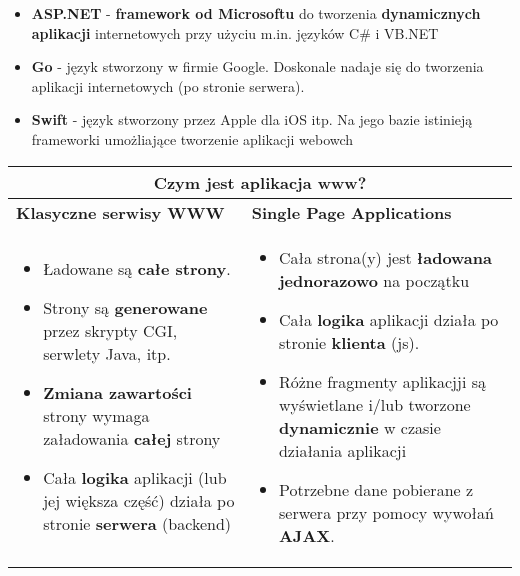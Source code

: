 \documentclass[../main.tex]{subfiles}
\begin{document}
\begin{itemize}
\begin{itemize}
            \item \textbf{ASP.NET} - \textbf{framework od Microsoftu} do tworzenia \textbf{dynamicznych aplikacji} internetowych przy użyciu m.in. języków C\# i VB.NET
            \item \textbf{Go} - język stworzony w firmie Google. Doskonale nadaje się do tworzenia aplikacji internetowych (po stronie serwera).
            \item \textbf{Swift} - język stworzony przez Apple dla iOS itp. Na jego bazie istinieją frameworki umożliające tworzenie aplikacji webowch
        \end{itemize}
    \end{itemize}


    \begin{table}[H]
        \begin{center}
            \begin{tabular}{|p{7.5cm}|p{8.5cm}|}
                \hline
                \multicolumn{2}{|c|}{\textbf{Czym jest aplikacja www?}}\\
                \hline
                \textbf{Klasyczne serwisy WWW} & \textbf{Single Page Applications}\\
                \hline
                \hline
                \begin{itemize}
                    \item Ładowane są \textbf{całe strony}.
                    \item Strony są \textbf{generowane} przez skrypty CGI, serwlety Java, itp.
                    \item \textbf{Zmiana zawartości} strony wymaga załadowania \textbf{całej} strony
                    \item Cała \textbf{logika} aplikacji (lub jej większa część) działa po stronie \textbf{serwera} (backend)
                \end{itemize}
                &
                \begin{itemize}
                    \item Cała strona(y) jest \textbf{ładowana jednorazowo} na początku
                    \item Cała \textbf{logika} aplikacji działa po stronie \textbf{klienta} (js).
                    \item Różne fragmenty aplikacjji są wyświetlane i/lub tworzone \textbf{dynamicznie} w czasie działania aplikacji
                    \item Potrzebne dane pobierane z serwera przy pomocy wywołań \textbf{AJAX}.
                \end{itemize}\\
                \hline
            \end{tabular}
        \end{center}
    \end{table}
\end{document}
